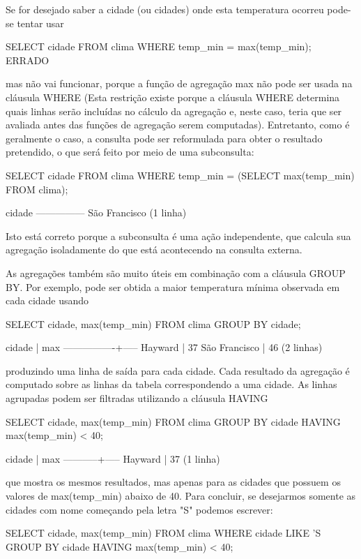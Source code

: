 Se for desejado saber a cidade (ou cidades) onde esta temperatura ocorreu pode-se tentar usar
\begin{BoxVerbatim}
SELECT cidade FROM clima WHERE temp_min = max(temp_min);     ERRADO
\end{BoxVerbatim}

mas não vai funcionar, porque a função de agregação max não pode ser usada na cláusula WHERE (Esta restrição existe porque a cláusula WHERE determina quais linhas serão incluídas no cálculo da agregação e, neste caso, teria que ser avaliada antes das funções de agregação serem computadas). Entretanto, como é geralmente o caso, a consulta pode ser reformulada para obter o resultado pretendido, o que será feito por meio de uma subconsulta:
\begin{BoxVerbatim}
SELECT cidade FROM clima
    WHERE temp_min = (SELECT max(temp_min) FROM clima);

    cidade
 ---------------
  São Francisco
  (1 linha)
\end{BoxVerbatim}

Isto está correto porque a subconsulta é uma ação independente, que calcula sua agregação isoladamente do que está acontecendo na consulta externa.

As agregações também são muito úteis em combinação com a cláusula GROUP BY. Por exemplo, pode ser obtida a maior temperatura mínima observada em cada cidade usando
\begin{BoxVerbatim}
SELECT cidade, max(temp_min)
    FROM clima
    GROUP BY cidade;

    cidade      | max
----------------+-----
Hayward         |  37
São Francisco   |  46
(2 linhas)
\end{BoxVerbatim}

produzindo uma linha de saída para cada cidade. Cada resultado da agregação é computado sobre as linhas da tabela correspondendo a uma cidade. As linhas agrupadas podem ser filtradas utilizando a cláusula HAVING
\begin{BoxVerbatim}
SELECT cidade, max(temp_min)
    FROM clima
    GROUP BY cidade
    HAVING max(temp_min) < 40;


  cidade   | max
-----------+-----
 Hayward   |  37
(1 linha)
\end{BoxVerbatim}

que mostra os mesmos resultados, mas apenas para as cidades que possuem os valores de max(temp\_min) abaixo de 40. Para concluir, se desejarmos somente as cidades com nome começando pela letra "S" podemos escrever:
\begin{BoxVerbatim}
SELECT cidade, max(temp_min)
    FROM clima
    WHERE cidade LIKE 'S%
    GROUP BY cidade
    HAVING max(temp_min) < 40;
\end{BoxVerbatim}

